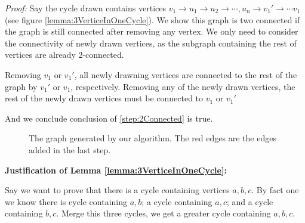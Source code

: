 \documentclass{article}
\newenvironment{solution}
    {\textit{Proof:}}
    {}
\theoremstyle{definition}
\theoremstyle{definition}
\theoremstyle{remark}
\begin{document}
\begin{solution}
	Say the cycle drawn contains vertices $v_1 \rightarrow  u_1 \rightarrow  u_2 \rightarrow  \cdots, u_n \rightarrow  v_1' \rightarrow  \cdots v_1$ (see figure \ref{lemma:3VerticeInOneCycle}). 
	We show this graph is two connected if the graph is still connected after removing any vertex. We only need to consider the connectivity of newly drawn vertices, as the subgraph containing the rest of vertices are already 2-connected.

	Removing $v_1$ or $v_1'$, all newly drawning vertices are connected to the rest of the graph by $v_1'$ or $v_1$, respectively.
	Removing any of the newly drawn vertices, the rest of the newly drawn vertices must be connected to $v_1$ or $v_1'$

	And we conclude conclusion of \ref{step:2Connected} is true.
	\begin{figure}
		\centering
		\label{fig:2Connected}
		\caption{The graph generated by our algorithm. The red edges are the edges added in the last step.}
	\end{figure}
	\newpage
	\textbf{Justification of Lemma \ref{lemma:3VerticeInOneCycle}:}

	Say we want to prove that there is a cycle containing vertices $a,b,c$. By fact one we know there is cycle containing $a,b$; a cycle containing $a,c$; and a cycle containing $b,c$. Merge this three cycles, we get a greater cycle containing $a,b,c$.

	

\end{solution}
\end{document}
